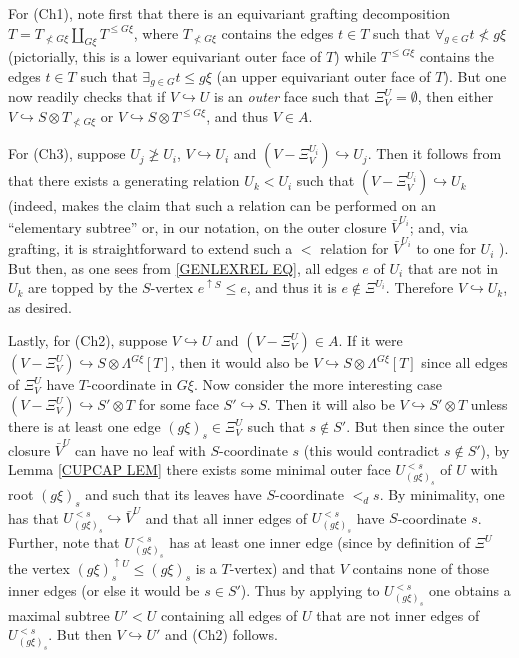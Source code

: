 \documentclass[a4paper,10pt
 ,draft
]{article}%
\begin{document}
\begin{example}
For (Ch1), note first that there is an equivariant grafting decomposition
$T = T_{\not < G\xi} \amalg_{G \xi} T^{\leq G\xi}$, 
where $T_{\not < G\xi}$ contains the edges $t \in T$ such that
$\forall_{g \in G} t \not < g\xi$ (pictorially, this is a lower equivariant outer face of $T$) 
while $T^{\leq G\xi}$
contains the edges $t \in T$ such that
$\exists_{g \in G} t \leq g\xi$ (an upper equivariant outer face of $T$).
But one now readily checks that if
$V \hookrightarrow U$ is an \textit{outer} face such that
$\Xi^U_V = \emptyset$, then either 
$V \hookrightarrow S \otimes T_{\not < G\xi}$ or 
$V \hookrightarrow S \otimes T^{\leq G\xi}$, and thus $V \in A$.

For (Ch3), suppose $U_j \not \geq U_i$, 
$V \hookrightarrow U_i$ and
$(V - \Xi^{U_i}_V) \hookrightarrow U_j$.
Then it follows from \cite[Lemma 7.37]{Per18}
that there exists a generating relation $U_k < U_i$
such that $(V - \Xi^{U_i}_V) \hookrightarrow U_k$
(indeed, \cite[Lemma 7.37]{Per18} makes the claim that such a relation can be performed on an ``elementary subtree'' \cite[Def. 7.16]{Per18} or, in our notation, on the outer closure $\bar{V}^{U_i}$; and, via grafting, it is straightforward to extend such a $<$ relation for $\bar{V}^{U_i}$ to one for $U_i$ \cite[Rem. 7.30]{Per18}). But then, as one sees from \eqref{GENLEXREL EQ},
all edges $e$ of $U_i$ that are not in $U_k$ are topped by the $S$-vertex $e^{\uparrow S}\leq e$, and thus it is $e \not \in \Xi^{U_i}$. Therefore $V \hookrightarrow U_k$, as desired.

Lastly, for (Ch2), suppose $V \hookrightarrow U$ and 
$(V - \Xi^{U}_V) \in A$.
If it were 
$(V-\Xi^{U}_V) \hookrightarrow S \otimes \Lambda^{G \xi}[T]$, then it would also be 
$V \hookrightarrow S \otimes \Lambda^{G \xi}[T]$
since all edges of $\Xi^{U}_V$ have 
$T$-coordinate in $G\xi$.
Now consider the more interesting case
$(V - \Xi^{U}_V) \hookrightarrow S' \otimes T$
for some face $S' \hookrightarrow S$.
Then it will also be 
$V \hookrightarrow S' \otimes T$
unless there is at least one edge
$(g \xi)_s \in \Xi^{U}_V$ such that $s \not \in S'$.
But then since the outer closure $\bar{V}^U$ can have no leaf with $S$-coordinate $s$ (this would contradict $s \not \in S'$), 
by Lemma \ref{CUPCAP LEM} there exists some minimal outer face $U_{(g\xi)_s}^{<s}$ of $U$ with root $(g\xi)_s$ and such that its leaves have $S$-coordinate $<_d s$.
By minimality, one has that $U_{(g\xi)_s}^{<s} \hookrightarrow \bar{V}^U$ and that all inner edges of $U_{(g\xi)_s}^{<s}$ have
$S$-coordinate $s$.
Further, note that $U_{(g\xi)_s}^{<s}$
has at least one inner edge
(since by definition of $\Xi^U$ the vertex 
$(g \xi)_s^{\uparrow U} \leq (g \xi)_s$ is a $T$-vertex)
and that $V$ contains none of those inner edges (or else it would be $s \in S'$).
Thus by applying \cite[Lemma 7.34]{Per18}
to $U_{(g\xi)_s}^{<s}$ one obtains a maximal subtree $U' < U$
containing all edges of $U$ that are not inner edges of $U_{(g\xi)_s}^{<s}$.
But then $V \hookrightarrow U'$ and (Ch2) follows.
\end{example}
\end{document}
